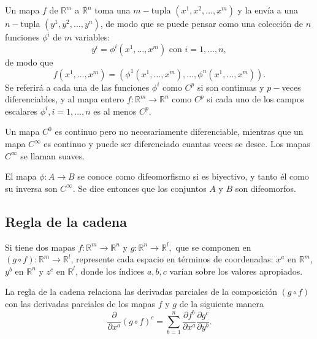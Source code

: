 Un mapa $f$ de $\mathbb{R}^m$ a $\mathbb{R}^n$ toma una $m-$tupla $(x^1,x^2,\dots,x^m)$ y la envía a una $n-$tupla $(y^1,y^2,\dots,y^n)$, de modo que se puede pensar como una colección de $n$ funciones $\phi^i$ de $m$ variables:
$$y^i=\phi^i(x^1,\dots,x^m)\text{ con }i=1,\dots,n,$$
de modo que
$$f(x^1,\dots,x^m)=(\phi^1(x^1,\dots,x^m),\dots,\phi^n(x^1,\dots,x^m)).$$
Se referirá a cada una de las funciones $\phi^i$ como $C^p$ si son continuas y $p-$veces diferenciables, y al mapa entero $f:\mathbb{R}^m\rightarrow \mathbb{R}^n$ como $C^p$ si cada uno de los campos escalares $\phi^i, i=1,\dots,n$ es al menos $C^p$.

Un mapa $C^0$ es continuo pero no necesariamente diferenciable, mientras que un mapa $C^\infty$ es continuo y puede ser diferenciado cuantas veces se desee. Los mapas $C^\infty$ se llaman suaves.
\begin{defi}[Difeomorfismo]
	El mapa $\phi:A\rightarrow B$ se conoce como difeomorfismo si es biyectivo, y tanto él como su inversa son $C^\infty$. Se dice entonces que los conjuntos $A$ y $B$ son difeomorfos.
\end{defi}

\subsection{Regla de la cadena}
Si tiene dos mapas $f:\mathbb{R}^m\rightarrow \mathbb{R}^n$ y $g:\mathbb{R}^n\rightarrow\mathbb{R}^l,$ que se componen en $(g\circ f):\mathbb{R}^m\rightarrow\mathbb{R}^l$, represente cada espacio en términos de coordenadas: $x^a$ en $\mathbb{R}^m$, $y^b$ en $\mathbb{R}^n$ y $z^c$ en $\mathbb{R}^l$, donde los índices $a,b,c$ varían sobre los valores apropiados.
\begin{center}
\end{center}

La regla de la cadena relaciona las derivadas parciales de la composición $(g\circ f)$ con las derivadas parciales de los mapas $f$ y $g$ de la siguiente manera
$$\frac{\partial}{\partial x^a}(g\circ f)^c=\sum_{b=1}^n\frac{\partial f^b}{\partial x^a}\frac{\partial g^c}{\partial y^b}.$$

